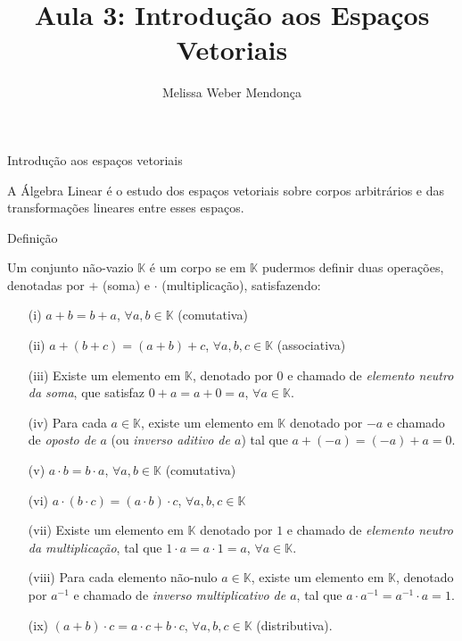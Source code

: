 \documentclass{beamer}
\title{Aula 3: Introdução aos Espaços Vetoriais}
\author{Melissa Weber Mendonça}
\begin{document}
\frame{\maketitle}

\begin{darkframes}

\begin{frame}{Introdução aos espaços vetoriais}
\begin{center}
\alert{A Álgebra Linear é o estudo dos espaços vetoriais sobre corpos arbitrários e das transformações lineares entre esses espaços.}
\end{center}
\end{frame}

\begin{frame}{}
\begin{block}{Definição}
{\footnotesize{%
  Um conjunto não-vazio ${\mathbb{K}}$ é um \alert{corpo} se em ${\mathbb{K}}$ pudermos definir duas operações, denotadas por $+$ (soma) e $\cdot$ (multiplicação), satisfazendo:
  \begin{itemize}
  \setlength\itemsep{0em}
  \item[(i)] $a+b=b+a$, $\forall a, b \in {\mathbb{K}}$ (comutativa)
  \item[(ii)] $a+(b+c) = (a+b)+c$, $\forall a, b, c \in {\mathbb{K}}$ (associativa)
  \item[(iii)] Existe um elemento em ${\mathbb{K}}$, denotado por $0$ e chamado de \emph{elemento neutro da soma}, que satisfaz $0+a=a+0=a$, $\forall a \in {\mathbb{K}}$.
  \item[(iv)] Para cada $a\in {\mathbb{K}}$, existe um elemento em ${\mathbb{K}}$ denotado por $-a$ e chamado de \emph{oposto de $a$} (ou \emph{inverso aditivo de $a$}) tal que $a+(-a)=(-a)+a = 0$.
  \item[(v)] $a\cdot b = b\cdot a$, $\forall a, b \in {\mathbb{K}}$ (comutativa)
  \item[(vi)] $a\cdot(b\cdot c) = (a\cdot b)\cdot c$, $\forall a, b, c \in {\mathbb{K}}$
  \item[(vii)] Existe um elemento em ${\mathbb{K}}$ denotado por $1$ e chamado de \emph{elemento neutro da multiplicação}, tal que $1\cdot a = a\cdot 1 = a$, $\forall a \in {\mathbb{K}}$.
  \item[(viii)] Para cada elemento não-nulo $a\in {\mathbb{K}}$, existe um elemento em ${\mathbb{K}}$, denotado por $a^{-1}$ e chamado de \emph{inverso multiplicativo de $a$}, tal que $a\cdot a^{-1}=a^{-1}\cdot a = 1$.
  \item[(ix)] $(a+b)\cdot c = a\cdot c + b\cdot c$, $\forall a, b, c \in {\mathbb{K}}$ (distributiva).
  \end{itemize}
  }}
\end{block}
\end{frame}


\end{darkframes}
\end{document}
